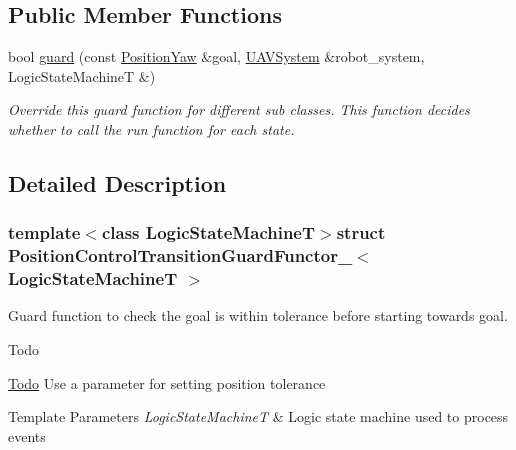 \subsection*{Public Member Functions}
\begin{DoxyCompactItemize}
\item 
bool \hyperlink{structPositionControlTransitionGuardFunctor___ad0334337a349f9964d0ba781e995dad6}{guard} (const \hyperlink{structPositionYaw}{Position\-Yaw} \&goal, \hyperlink{classUAVSystem}{U\-A\-V\-System} \&robot\-\_\-system, Logic\-State\-Machine\-T \&)
\begin{DoxyCompactList}\small\item\em Override this guard function for different sub classes. This function decides whether to call the run function for each state. \end{DoxyCompactList}\end{DoxyCompactItemize}


\subsection{Detailed Description}
\subsubsection*{template$<$class Logic\-State\-Machine\-T$>$struct Position\-Control\-Transition\-Guard\-Functor\-\_\-$<$ Logic\-State\-Machine\-T $>$}

Guard function to check the goal is within tolerance before starting towards goal. 

\begin{DoxyRefDesc}{Todo}
\item[\hyperlink{todo__todo000009}{Todo}]Use a parameter for setting position tolerance\end{DoxyRefDesc}



\begin{DoxyTemplParams}{Template Parameters}
{\em Logic\-State\-Machine\-T} & Logic state machine used to process events \\
\hline
\end{DoxyTemplParams}


